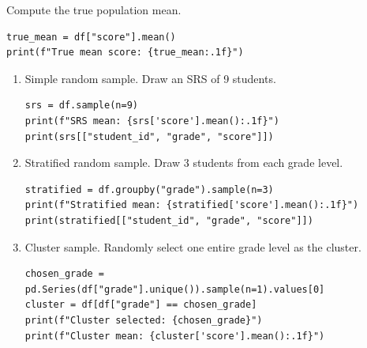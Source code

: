 Compute the true population mean.

\begin{verbatim}
true_mean = df["score"].mean()
print(f"True mean score: {true_mean:.1f}")
\end{verbatim}

\begin{enumerate} 

\item Simple random sample. Draw an SRS of 9 students.

\begin{verbatim}
srs = df.sample(n=9)
print(f"SRS mean: {srs['score'].mean():.1f}")
print(srs[["student_id", "grade", "score"]])
\end{verbatim}

\item Stratified random sample. Draw 3 students from each grade level.

\begin{verbatim}
stratified = df.groupby("grade").sample(n=3)
print(f"Stratified mean: {stratified['score'].mean():.1f}")
print(stratified[["student_id", "grade", "score"]])
\end{verbatim}

\item Cluster sample. Randomly select one entire grade level as the cluster.

\begin{verbatim}
chosen_grade = pd.Series(df["grade"].unique()).sample(n=1).values[0]
cluster = df[df["grade"] == chosen_grade]
print(f"Cluster selected: {chosen_grade}")
print(f"Cluster mean: {cluster['score'].mean():.1f}")
\end{verbatim}

\end{enumerate}

